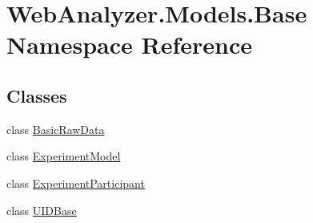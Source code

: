 \hypertarget{namespace_web_analyzer_1_1_models_1_1_base}{}\section{Web\+Analyzer.\+Models.\+Base Namespace Reference}
\label{namespace_web_analyzer_1_1_models_1_1_base}
\subsection*{Classes}
\begin{DoxyCompactItemize}
\item 
class \hyperlink{class_web_analyzer_1_1_models_1_1_base_1_1_basic_raw_data}{Basic\+Raw\+Data}
\item 
class \hyperlink{class_web_analyzer_1_1_models_1_1_base_1_1_experiment_model}{Experiment\+Model}
\item 
class \hyperlink{class_web_analyzer_1_1_models_1_1_base_1_1_experiment_participant}{Experiment\+Participant}
\item 
class \hyperlink{class_web_analyzer_1_1_models_1_1_base_1_1_u_i_d_base}{U\+I\+D\+Base}
\end{DoxyCompactItemize}
